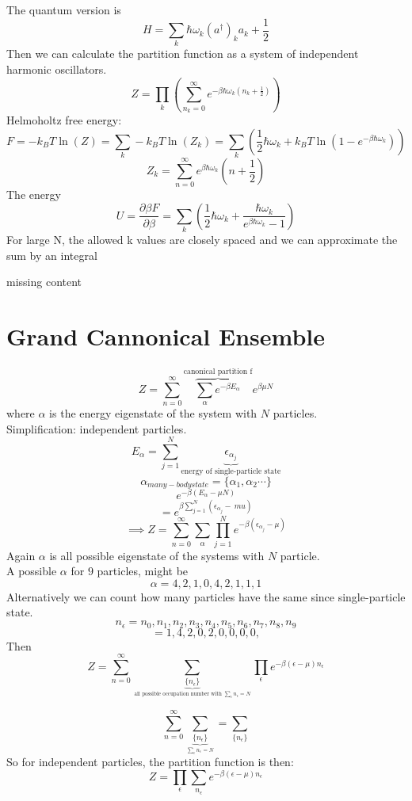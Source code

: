 \documentclass[11pt]{book}
\theoremstyle{definition}
\begin{document}
The quantum version is 
\[ H = \sum_k \hbar \omega_k (a^{\dag})_k a_k + \frac{1}{2}\] 
Then we can calculate the partition function as a system of independent harmonic oscillators. 
\[ Z = \prod_k \left( \sum_{n_k=0}^{\infty} e^{-\beta \hbar \omega_k (n_k+ \frac{1}{2})}  \right)  \] 
Helmoholtz free energy:
\[ F = -k_BT\ln(Z) = \sum_k -k_BT\ln(Z_k) = 
\sum_k \left( \frac{1}{2}\hbar \omega_k + k_BT\ln(1-e^{-\beta \hbar \omega_k})  \right) \] 
\[ Z_k = \sum_{n=0}^{\infty} e^{\beta \hbar \omega_k} (n+ \frac{1}{2}) \] 
The energy 
\[ U =\frac{\partial \beta F}{\partial \beta} = \sum_k \left( \frac{1}{2}\hbar \omega_k + \frac{\hbar \omega_k}{e^{\beta \hbar \omega_k}-1} \right)  \] 
For large N, the allowed k values are closely spaced and we can approximate the sum by an integral 

\large{missing content}

\newpage
\section{Grand Cannonical Ensemble}
\[ Z = \sum_{n=0}^{\infty} 
	\overbrace{\sum_{\alpha} e^{-\beta E_{\alpha}}}^{\text{canonical partition f}}
e^{\beta \mu N} \] 
where $ \alpha $ is the energy eigenstate of the system with $ N $ particles. \\
Simplification: independent particles.
\[ E_{\alpha} = \sum_{j=1}^{N} 
\underbrace{\epsilon_{\alpha_j}}_{\text{energy of single-particle state}} \] 
\[ \alpha_{many-body state} = \{\alpha_1, \alpha_2 \cdots\} \] 
\[ e^{-\beta \left( E_\alpha - \mu N \right) } \] 
\[ = e^{\beta \sum_{j=1}^{N}\left( \epsilon_{\alpha_j} -\ mu \right) } \] 
\[ \implies Z = \sum_{n=0}^{\infty}\sum_\alpha \prod_{j=1}^{N} e^{-\beta\left( \epsilon_{\alpha_j} - \mu \right) } \] 
Again $ \alpha $ is all possible eigenstate of the systems with $N$ particle. \\
A possible $ \alpha $ for $ 9 $ particles, might be
\[ \alpha = 4,2,1,0,4,2,1,1,1 \] 
Alternatively we can count how many particles have the same since single-particle state.
\[ n_{\epsilon} = {n_0,n_1,n_2,n_3,n_4,n_5,n_6,n_7,n_8,n_9} \] 
\[ = {1,4,2,0,2,0,0,0,0,} \] 
Then 
\[ Z = \sum_{n=0}^{\infty}\sum_{
	\underbrace{\{n_{\epsilon}\}}_{\text{all possible occupation number with } \sum_{\epsilon} n_{\epsilon}=N }}
\prod_{\epsilon} e^{-\beta( \epsilon - \mu )n_{\epsilon}} \] 

\[ \sum_{n=0}^{\infty} \sum_{
	\underbrace{\{n_{\epsilon}\}}_{\sum_{\epsilon} n_{\epsilon} = N}}
= \sum_{ \{n_{\epsilon}\} } \] 
So for independent particles, the partition function is then:
\[ Z = \prod_{\epsilon} \sum_{n_{\epsilon}} e^{-\beta(\epsilon-\mu)n_{\epsilon}}\] 
\end{document}
